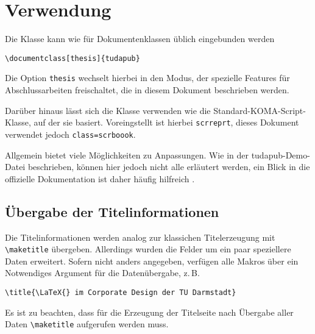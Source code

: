 \documentclass[
	ngerman,
	ruledheaders=chapter,%
	class=book,%
	thesis={
		type=dr,
		dr=rernat
	},
	accentcolor=9c,%
	custommargins=true,%
	marginpar=false,%
	parskip=half-,%
	fontsize=11pt,%
]{tudapub}
\let\code\texttt
\begin{document}
\mainmatter

	

\chapter{Verwendung}
Die Klasse kann wie für Dokumentenklassen üblich eingebunden werden
\begin{verbatim}
\documentclass[thesis]{tudapub}
\end{verbatim}
Die Option \code{thesis} wechselt hierbei in den Modus, der spezielle Features für Abschlussarbeiten freischaltet, die in diesem Dokument beschrieben werden.

Darüber hinaus lässt sich die Klasse verwenden wie die Standard-KOMA-Script-Klasse, auf der sie basiert. 
Voreingstellt ist hierbei \code{scrreprt}, dieses Dokument verwendet jedoch \code{class=scrboook}.

Allgemein bietet \KOMAScript{} viele Möglichkeiten  zu Anpassungen. Wie in der tudapub-Demo-Datei beschrieben, können hier jedoch nicht alle erläutert werden, ein Blick in die offizielle Dokumentation ist daher häufig hilfreich \cite{scrguide}.
	
\section{Übergabe der Titelinformationen}
	
Die Titelinformationen werden analog zur klassichen Titelerzeugung mit \verb+\maketitle+ übergeben. Allerdings wurden die Felder um ein paar speziellere Daten erweitert. Sofern nicht anders angegeben, verfügen alle Makros über ein Notwendiges Argument für die Datenübergabe, z.\,B. 
\begin{verbatim}
\title{\LaTeX{} im Corporate Design der TU Darmstadt}
\end{verbatim}
Es ist zu beachten, dass für die Erzeugung der Titelseite nach Übergabe aller Daten \verb+\maketitle+ aufgerufen werden muss. 
	
\end{document}
